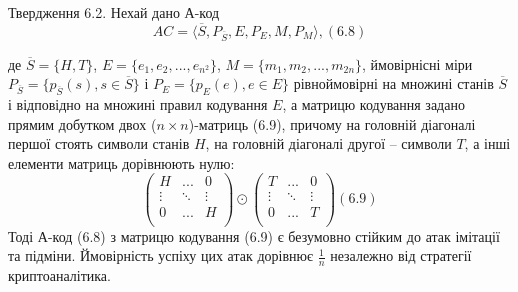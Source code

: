 \begin{claim}
    Твердження 6.2. Нехай дано А-код
    \begin{equation}
        AC = \langle \overline{S}, P_{\overline{S}}, E, P_E, M, P_M \rangle, (6.8)
    \end{equation}

    де $\overline{S} = \{H, T\}$, $E = \{e_1, e_2, ..., e_{n^2}\}$, $M = \{m_1, m_2, ..., m_{2n}\}$, ймовірнісні міри
    $P_{\overline{S}} = \{p_{\overline{S}}(s), s \in \overline{S}\}$ і $P_E = \{p_E(e), e \in E\}$ рівноймовірні
    на множині станів $\overline{S}$ і відповідно
    на множині правил кодування $E$, а матрицю кодування задано прямим добутком
    двох ($n \times n$)-матриць (6.9), причому на головній діагоналі першої стоять символи
    станів $H$, на головній діагоналі другої -- символи $T$, а інші елементи матриць
    дорівнюють нулю:
    \begin{equation}
        \begin{pmatrix}
            H & ... & 0 \\
            \vdots & \ddots & \vdots \\
            0 & ... & H \\
        \end{pmatrix}
        \odot \begin{pmatrix}
            T & ... & 0 \\
            \vdots & \ddots & \vdots \\
            0 & ... & T \\
        \end{pmatrix} (6.9)
    \end{equation}
    Тоді А-код (6.8) з матрицю кодування (6.9) є безумовно стійким до атак імітації та
    підміни. Ймовірність успіху цих атак дорівнює $\frac{1}{n}$ незалежно від стратегії
    криптоаналітика.
\end{claim}
